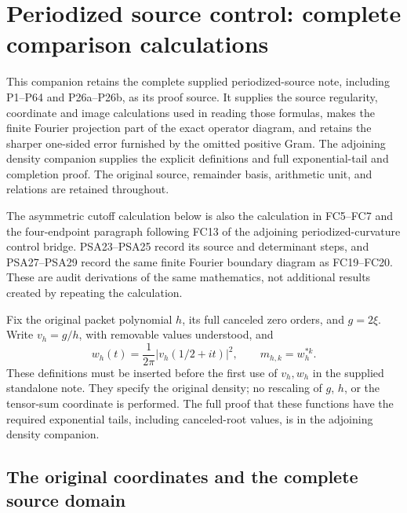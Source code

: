 \section{Periodized source control: complete comparison calculations}
\label{sec:periodized-source-intake-proofs}

This companion retains the complete supplied periodized-source note,
including P1--P64 and P26a--P26b, as its proof source. It supplies the
source regularity, coordinate and image calculations used in reading
those formulas, makes the finite Fourier projection part of the exact
operator diagram, and retains the sharper one-sided error furnished by
the omitted positive Gram. The adjoining density companion supplies the
explicit definitions and full exponential-tail and completion proof.
The original source, remainder basis, arithmetic unit, and relations are
retained throughout.

The asymmetric cutoff calculation below is also the calculation in
FC5--FC7 and the four-endpoint paragraph following FC13 of the adjoining
periodized-curvature control bridge. PSA23--PSA25 record its source
and determinant steps, and PSA27--PSA29 record the same finite Fourier
boundary diagram as FC19--FC20. These
are audit derivations of the same mathematics, not additional results
created by repeating the calculation.

Fix the original packet polynomial $h$, its full canceled zero orders,
and $g=2\xi$. Write $v_h=g/h$, with removable values understood, and
\[
 w_h(t)=\frac{1}{2\pi}|v_h(1/2+it)|^2,
 \qquad m_{h,k}=w_h^{*k}.
 \tag{PSA1}
\]
These definitions must be inserted before the first use of $v_h,w_h$ in
the supplied standalone note. They specify the original density; no
rescaling of $g$, $h$, or the tensor-sum coordinate is performed. The
full proof that these functions have the required exponential tails,
including canceled-root values, is in the adjoining density companion.

\subsection{The original coordinates and the complete source domain}


